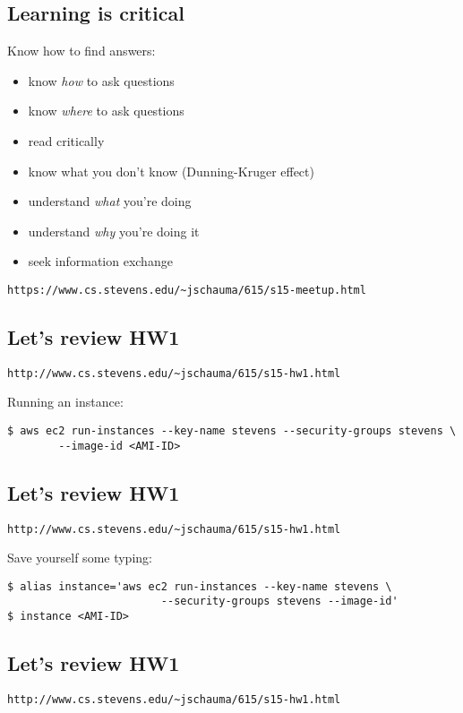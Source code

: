 \documentclass[xga]{xdvislides}
\begin{document}
\subsection{Learning is critical}
Know how to find answers:
\begin{itemize}
	\item know {\em how} to ask questions
	\item know {\em where} to ask questions
	\item read critically
	\item know what you don't know (Dunning-Kruger effect)
	\item understand {\em what} you're doing
	\item understand {\em why} you're doing it
	\item seek information exchange
\end{itemize}
\vspace{.5in}
\verb+https://www.cs.stevens.edu/~jschauma/615/s15-meetup.html+

\subsection{Let's review HW1}
{\tt http://www.cs.stevens.edu/\~{}jschauma/615/s15-hw1.html} \\
\vspace{.5in}

Running an instance:
\begin{verbatim}
$ aws ec2 run-instances --key-name stevens --security-groups stevens \
        --image-id <AMI-ID>
\end{verbatim}

\subsection{Let's review HW1}
{\tt http://www.cs.stevens.edu/\~{}jschauma/615/s15-hw1.html} \\
\vspace{.5in}

Save yourself some typing:
\begin{verbatim}
$ alias instance='aws ec2 run-instances --key-name stevens \
                        --security-groups stevens --image-id'
$ instance <AMI-ID>
\end{verbatim}

\subsection{Let's review HW1}
{\tt http://www.cs.stevens.edu/\~{}jschauma/615/s15-hw1.html} \\
\vspace{.5in}
\end{document}
